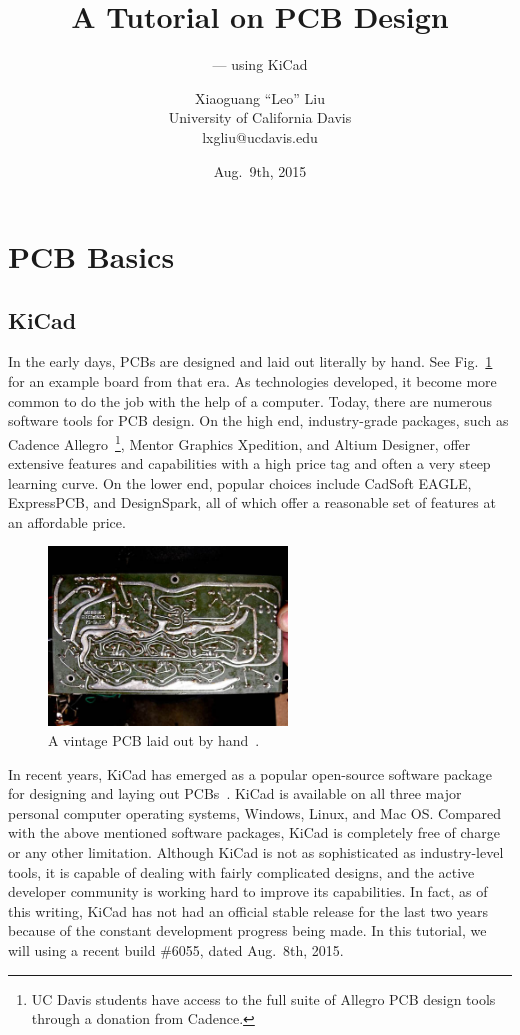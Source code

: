 \documentclass[12pt,letterpaper]{scrartcl}
\title{A Tutorial on PCB Design}
\subtitle{--- using KiCad}
\author{Xiaoguang ``Leo'' Liu \\University of California Davis \\ lxgliu@ucdavis.edu}
\date{Aug.~9th, 2015}
\begin{document}
\maketitle

\tableofcontents

\newpage
\section{PCB Basics}


\newpage
\subsection{KiCad}
In the early days, PCBs are designed and laid out literally by hand. See Fig.~\ref{fig:hand-pcb} for an example board from that era. As technologies developed, it become more common to do the job with the help of a computer. Today, there are numerous software tools for PCB design. On the high end, industry-grade packages, such as Cadence Allegro~\footnote{UC Davis students have access to the full suite of Allegro PCB design tools through a donation from Cadence.}, Mentor Graphics Xpedition, and Altium Designer, offer extensive features and capabilities with a high price tag and often a very steep learning curve. On the lower end, popular choices include CadSoft EAGLE, ExpressPCB, and DesignSpark, all of which offer a reasonable set of features at an affordable price. 

\begin{figure}[ht]
\centering
\includegraphics[width=2.5in]{hand-pcb.jpg}
\caption{A vintage PCB laid out by hand~\cite{hand-pcb}.}
\label{fig:hand-pcb}
\end{figure}

In recent years, KiCad has emerged as a popular open-source software package for designing and laying out PCBs~\cite{kicad}. KiCad is available on all three major personal computer operating systems, Windows, Linux, and Mac OS. 
Compared with the above mentioned software packages, KiCad is completely free of charge or any other limitation. Although KiCad is not as sophisticated as industry-level tools, it is capable of dealing with fairly complicated designs, and the active developer community is working hard to improve its capabilities. In fact, as of this writing, KiCad has not had an official stable release for the last two years because of the constant development progress being made. In this tutorial, we will using a recent build \#6055, dated Aug.~8th, 2015.
\end{document}

